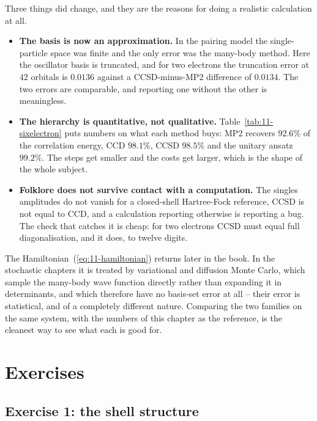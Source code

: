Three things did change, and they are the reasons for doing a realistic
calculation at all.

\begin{itemize}
\item \textbf{The basis is now an approximation.}  In the pairing model the
  single-particle space was finite and the only error was the many-body
  method.  Here the oscillator basis is truncated, and for two electrons the
  truncation error at $42$ orbitals is $0.0136$ against a CCSD-minus-MP2
  difference of $0.0134$.  The two errors are comparable, and reporting one
  without the other is meaningless.
\item \textbf{The hierarchy is quantitative, not qualitative.}
  Table~\ref{tab:11-sixelectron} puts numbers on what each method buys:
  MP2 recovers $92.6\%$ of the correlation energy, CCD $98.1\%$, CCSD
  $98.5\%$ and the unitary ansatz $99.2\%$.  The steps get smaller and the
  costs get larger, which is the shape of the whole subject.
\item \textbf{Folklore does not survive contact with a computation.}  The
  singles amplitudes do not vanish for a closed-shell Hartree-Fock reference,
  CCSD is not equal to CCD, and a calculation reporting otherwise is reporting
  a bug.  The check that catches it is cheap: for two electrons CCSD must
  equal full diagonalisation, and it does, to twelve digits.
\end{itemize}

The Hamiltonian~(\ref{eq:11-hamiltonian}) returns later in the book.  In the
stochastic chapters it is treated by variational and diffusion Monte Carlo,
which sample the many-body wave function directly rather than expanding it in
determinants, and which therefore have no basis-set error at all -- their
error is statistical, and of a completely different nature.  Comparing the two
families on the same system, with the numbers of this chapter as the
reference, is the cleanest way to see what each is good for.

\section{Exercises}

\subsection*{Exercise 1: the shell structure}
\label{ex:11-shells}

